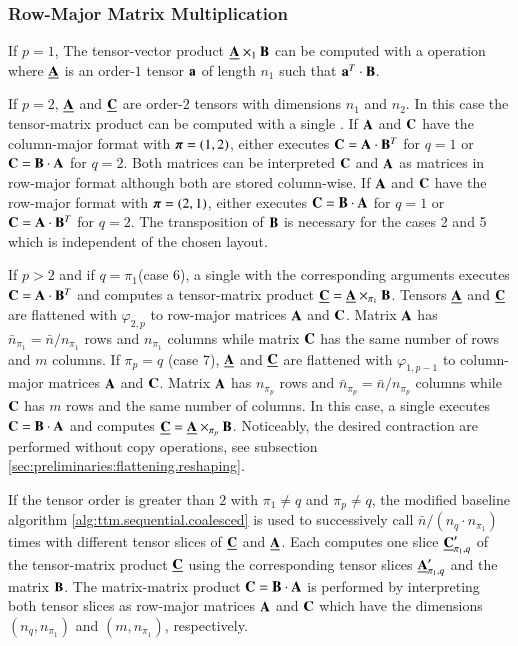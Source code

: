 \subsubsection{Row-Major Matrix Multiplication}

If $p=1$, The tensor-vector product $\underline{\mathbf{A}} \times_1 \mathbf{B}$ can be computed with a  operation where $\underline{\mathbf{A}}$ is an order-$1$ tensor $\mathbf{a}$ of length $n_1$ such that $\mathbf{a}^T \cdot \mathbf{B}$.

If $p=2$, $\underline{\mathbf{A}}$ and $\underline{\mathbf{C}}$ are order-$2$ tensors with dimensions $n_1$ and $n_2$.
In this case the tensor-matrix product can be computed with a single .
If $\mathbf{A}$ and $\mathbf{C}$ have the column-major format with $\boldsymbol{\pi}=(1,2)$,  either executes $\mathbf{C} = \mathbf{A} \cdot \mathbf{B}^T$ for $q =1$ or $\mathbf{C} = \mathbf{B} \cdot \mathbf{A}$ for $q=2$.
Both matrices can be interpreted $\mathbf{C}$ and $\mathbf{A}$ as matrices in row-major format although both are stored column-wise.
If $\mathbf{A}$ and $\mathbf{C}$ have the row-major format with $\boldsymbol{\pi}=(2,1)$,  either executes $\mathbf{C} = \mathbf{B} \cdot \mathbf{A}$ for $q =1$ or $\mathbf{C} = \mathbf{A} \cdot \mathbf{B}^T$ for $q=2$. 
The transposition of $\mathbf{B}$ is necessary for the cases 2 and 5 which is independent of the chosen layout.

If $p>2$ and if $q=\pi_1$(case 6), a single  with the corresponding arguments executes $\mathbf{C} = \mathbf{A} \cdot \mathbf{B}^T$ and computes a tensor-matrix product $\underline{\mathbf{C}} = \underline{\mathbf{A}} \times_{\pi_1} \mathbf{B}$.
Tensors $\underline{\mathbf{A}}$ and $\underline{\mathbf{C}}$ are flattened with $\varphi_{2,p}$ to row-major matrices $\mathbf{A}$ and $\mathbf{C}$.
Matrix $\mathbf{A}$ has $\bar{n}_{\pi_1} = \bar{n} / n_{\pi_1}$ rows and $n_{\pi_1}$ columns while matrix $\mathbf{C}$ has the same number of rows and $m$ columns.
If $\pi_p=q$ (case 7), $\underline{\mathbf{A}}$ and $\underline{\mathbf{C}}$ are flattened with $\varphi_{1,p-1}$ to column-major matrices $\mathbf{A}$ and $\mathbf{C}$.
Matrix $\mathbf{A}$ has $n_{\pi_p}$ rows and $\bar{n}_{\pi_p} =  \bar{n} / n_{\pi_p}$ columns while $\mathbf{C}$ has $m$ rows and the same number of columns.
In this case, a single  executes $\mathbf{C} = \mathbf{B} \cdot \mathbf{A}$ and computes $\underline{\mathbf{C}} = \underline{\mathbf{A}} \times_{\pi_p} \mathbf{B}$.
Noticeably, the desired contraction are performed without copy operations, see subsection \ref{sec:preliminaries:flattening.reshaping}. 

If the tensor order is greater than $2$ with $\pi_1\neq q$ and $\pi_p \neq q$, the modified baseline algorithm \ref{alg:ttm.sequential.coalesced} is used to successively call $\bar{n} / (n_q \cdot n_{\pi_1})$ times  with different tensor slices of $\underline{\mathbf{C}}$ and $\underline{\mathbf{A}}$.
Each  computes one slice $\underline{\mathbf{C}}_{\pi_1,q}'$ of the tensor-matrix product $\underline{\mathbf{C}}$ using the corresponding tensor slices $\underline{\mathbf{A}}_{\pi_1,q}'$ and the matrix $\mathbf{B}$.
The matrix-matrix product $\mathbf{C} = \mathbf{B} \cdot \mathbf{A}$ is performed by interpreting both tensor slices as row-major matrices $\mathbf{A}$ and $\mathbf{C}$ which have the dimensions $(n_q,n_{\pi_1})$ and $(m,n_{\pi_1})$, respectively.

